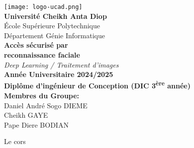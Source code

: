 \documentclass[12pt,a4paper]{article}
\begin{document}
\begin{titlepage}
\begin{center}
    \texttt{[image: logo-ucad.png]}\\[1cm]
    
    {\LARGE\textbf{Université Cheikh Anta Diop}}\\[0.5cm]
    {\Large École Supérieure Polytechnique}\\[0.3cm]
    {\large Département Génie Informatique}\\[2cm]
    
    {\Huge\textbf{Accès sécurisé par\\reconnaissance faciale}}\\[2cm]
    
    {\Large\textit{Deep Learning / Traitement d'images}}\\[2cm]
    
    \textbf{Année Universitaire 2024/2025}\\
    \textbf{Diplôme d'ingénieur de Conception (DIC 3\textsuperscript{ère} année)}\\[2cm]
    
    \textbf{Membres du Groupe:}\\[0.5cm]
    Daniel André Sogo DIEME\\
    Cheikh GAYE\\
    Pape Diere BODIAN\\[2cm]
\end{center}
\end{titlepage}

\tableofcontents
\newpage

Le cors
\end{document}
